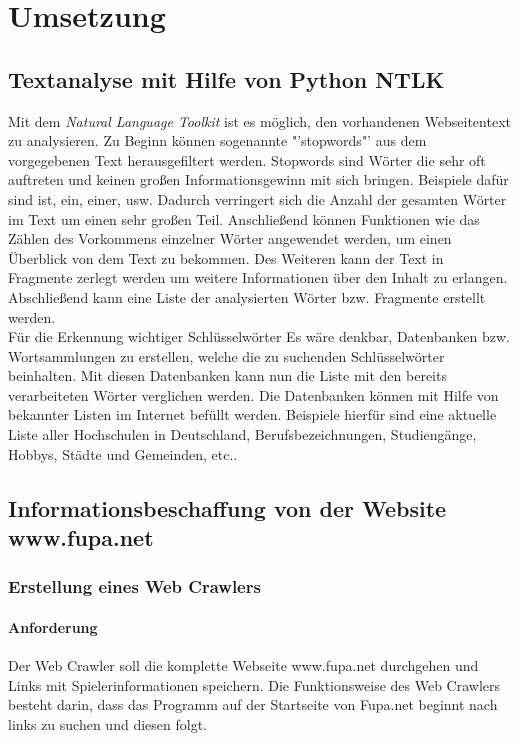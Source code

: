 
\chapter{Umsetzung}  %
\label{cha:} %
\section{Textanalyse mit Hilfe von Python NTLK}
Mit dem \textit{Natural Language Toolkit} ist es möglich, den vorhandenen Webseitentext zu analysieren. Zu Beginn können sogenannte "'stopwords"' aus dem vorgegebenen Text herausgefiltert werden. Stopwords sind Wörter die sehr oft auftreten und keinen großen Informationsgewinn mit sich bringen. Beispiele dafür sind ist, ein, einer, usw. Dadurch verringert sich die Anzahl der gesamten Wörter im Text um einen sehr großen Teil. Anschließend können Funktionen wie das Zählen des Vorkommens einzelner Wörter angewendet werden, um einen Überblick von dem Text zu bekommen. Des Weiteren kann der Text in Fragmente zerlegt werden um weitere Informationen über den Inhalt zu erlangen. Abschließend kann eine Liste der analysierten Wörter bzw. Fragmente erstellt werden.\\
Für die Erkennung wichtiger Schlüsselwörter
Es wäre denkbar, Datenbanken bzw. Wortsammlungen zu erstellen, welche die zu suchenden Schlüsselwörter beinhalten. Mit diesen Datenbanken kann nun die Liste mit den bereits verarbeiteten Wörter verglichen werden. Die Datenbanken können mit Hilfe von bekannter Listen im Internet befüllt werden. Beispiele hierfür sind eine aktuelle Liste aller Hochschulen in Deutschland, Berufsbezeichnungen, Studiengänge, Hobbys, Städte und Gemeinden, etc..
\section{Informationsbeschaffung von der Website www.fupa.net} %
\label{sec:} %


\subsection{Erstellung eines Web Crawlers} %
\label{sse:}
\subsubsection{Anforderung}
Der Web Crawler soll die komplette Webseite www.fupa.net durchgehen und Links mit Spielerinformationen speichern.
Die Funktionsweise des Web Crawlers besteht darin, dass das Programm auf der Startseite von Fupa.net beginnt nach links zu suchen und diesen folgt.
